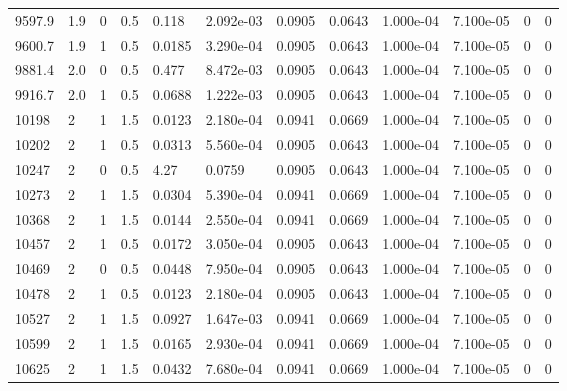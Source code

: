 \documentclass[preview]{standalone}
\begin{document}
{{{\begin{tabular}{L{1.2cm}C{1.2cm} C{0.3cm}C{0.5cm} C{1.4cm}C{1.4cm} C{1.4cm}C{1.4cm} C{1.6cm}C{1.6cm} C{1.6cm}C{1.6cm}}
  9597.9  &   1.9  & 0     & 0.5 &  0.118  & 2.092e-03  &  0.0905&   0.0643& 1.000e-04 & 7.100e-05   &  0 & 0  \\ 
  9600.7  &   1.9  & 1     & 0.5 &  0.0185  & 3.290e-04  &  0.0905&   0.0643& 1.000e-04 & 7.100e-05   &  0 & 0  \\ 
  9881.4  &   2.0  & 0     & 0.5 &  0.477  & 8.472e-03  &  0.0905&   0.0643& 1.000e-04 & 7.100e-05   &  0 & 0  \\ 
  9916.7  &   2.0  & 1     & 0.5 &  0.0688  & 1.222e-03  &  0.0905&   0.0643& 1.000e-04 & 7.100e-05   &  0 & 0  \\ 
  10198  &     2  & 1     & 1.5 &  0.0123  & 2.180e-04  &  0.0941&   0.0669& 1.000e-04 & 7.100e-05   &  0 & 0  \\ 
  10202  &     2  & 1     & 0.5 &  0.0313  & 5.560e-04  &  0.0905&   0.0643& 1.000e-04 & 7.100e-05   &  0 & 0  \\ 
  10247  &     2  & 0     & 0.5 &  4.27  & 0.0759  &  0.0905&   0.0643& 1.000e-04 & 7.100e-05   &  0 & 0  \\ 
  10273  &     2  & 1     & 1.5 &  0.0304  & 5.390e-04  &  0.0941&   0.0669& 1.000e-04 & 7.100e-05   &  0 & 0  \\ 
  10368  &     2  & 1     & 1.5 &  0.0144  & 2.550e-04  &  0.0941&   0.0669& 1.000e-04 & 7.100e-05   &  0 & 0  \\ 
  10457  &     2  & 1     & 0.5 &  0.0172  & 3.050e-04  &  0.0905&   0.0643& 1.000e-04 & 7.100e-05   &  0 & 0  \\ 
  10469  &     2  & 0     & 0.5 &  0.0448  & 7.950e-04  &  0.0905&   0.0643& 1.000e-04 & 7.100e-05   &  0 & 0  \\ 
  10478  &     2  & 1     & 0.5 &  0.0123  & 2.180e-04  &  0.0905&   0.0643& 1.000e-04 & 7.100e-05   &  0 & 0  \\ 
  10527  &     2  & 1     & 1.5 &  0.0927  & 1.647e-03  &  0.0941&   0.0669& 1.000e-04 & 7.100e-05   &  0 & 0  \\ 
  10599  &     2  & 1     & 1.5 &  0.0165  & 2.930e-04  &  0.0941&   0.0669& 1.000e-04 & 7.100e-05   &  0 & 0  \\ 
  10625  &     2  & 1     & 1.5 &  0.0432  & 7.680e-04  &  0.0941&   0.0669& 1.000e-04 & 7.100e-05   &  0 & 0  \\ 
\hline 
\end{tabular} 

}}}
\end{document}
